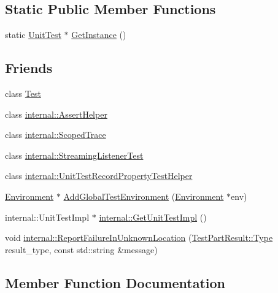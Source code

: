 \subsection*{Static Public Member Functions}
\begin{DoxyCompactItemize}
\item 
static \mbox{\hyperlink{classtesting_1_1_unit_test}{Unit\+Test}} $\ast$ \mbox{\hyperlink{classtesting_1_1_unit_test_af254e2e695471eb9f128bc556bae3668}{Get\+Instance}} ()
\end{DoxyCompactItemize}
\subsection*{Friends}
\begin{DoxyCompactItemize}
\item 
class \mbox{\hyperlink{classtesting_1_1_unit_test_a5b78b1c2e1fa07ffed92da365593eaa4}{Test}}
\item 
class \mbox{\hyperlink{classtesting_1_1_unit_test_a183151aa061362c87572e743fe233db1}{internal\+::\+Assert\+Helper}}
\item 
class \mbox{\hyperlink{classtesting_1_1_unit_test_afa3927576c08d7b1e197ba16b2b3dcb7}{internal\+::\+Scoped\+Trace}}
\item 
class \mbox{\hyperlink{classtesting_1_1_unit_test_adc037d188dab349a94868991955c9cd4}{internal\+::\+Streaming\+Listener\+Test}}
\item 
class \mbox{\hyperlink{classtesting_1_1_unit_test_ae970f89a9f477a349fe5778be85ef42e}{internal\+::\+Unit\+Test\+Record\+Property\+Test\+Helper}}
\item 
\mbox{\hyperlink{classtesting_1_1_environment}{Environment}} $\ast$ \mbox{\hyperlink{classtesting_1_1_unit_test_a5ec26e4c31220ff8e769cc09689a4d6d}{Add\+Global\+Test\+Environment}} (\mbox{\hyperlink{classtesting_1_1_environment}{Environment}} $\ast$env)
\item 
internal\+::\+Unit\+Test\+Impl $\ast$ \mbox{\hyperlink{classtesting_1_1_unit_test_a56e56be7066957d612e53b5c60f6ac08}{internal\+::\+Get\+Unit\+Test\+Impl}} ()
\item 
void \mbox{\hyperlink{classtesting_1_1_unit_test_a73f5a158c13793b90c80d854c9a75120}{internal\+::\+Report\+Failure\+In\+Unknown\+Location}} (\mbox{\hyperlink{classtesting_1_1_test_part_result_a65ae656b33fdfdfffaf34858778a52d5}{Test\+Part\+Result\+::\+Type}} result\+\_\+type, const std\+::string \&message)
\end{DoxyCompactItemize}


\subsection{Member Function Documentation}
\mbox{\label{classtesting_1_1_unit_test_afb26f53c070675638033436f35bad889}} 
